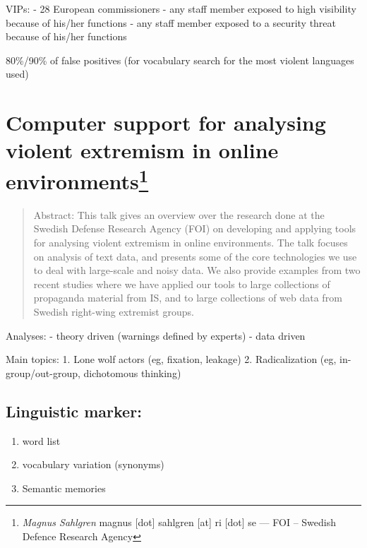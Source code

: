 \documentclass[]{book}
\providecommand{\tightlist}{%
  \setlength{\itemsep}{0pt}\setlength{\parskip}{0pt}}
\let\rmarkdownfootnote\footnote%
\def\footnote{\protect\rmarkdownfootnote}
\theoremstyle{definition}
\theoremstyle{definition}
\theoremstyle{definition}
\theoremstyle{remark}
\begin{document}
VIPs: - 28 European commissioners - any staff member exposed to high
visibility because of his/her functions - any staff member exposed to a
security threat because of his/her functions

80\%/90\% of false positives (for vocabulary search for the most violent
languages used)

\section[Computer support for analysing violent extremism in online
environments]{\texorpdfstring{Computer support for analysing violent
extremism in online environments\footnote{\emph{Magnus Sahlgren} magnus
  {[}dot{]} sahlgren {[}at{]} ri {[}dot{]} se --- FOI -- Swedish Defence
  Research Agency}}{Computer support for analysing violent extremism in online environments}}\label{computer-support-for-analysing-violent-extremism-in-online-environments}

\begin{quote}
Abstract: This talk gives an overview over the research done at the
Swedish Defense Research Agency (FOI) on developing and applying tools
for analysing violent extremism in online environments. The talk focuses
on analysis of text data, and presents some of the core technologies we
use to deal with large-scale and noisy data. We also provide examples
from two recent studies where we have applied our tools to large
collections of propaganda material from IS, and to large collections of
web data from Swedish right-wing extremist groups.
\end{quote}

Analyses: - theory driven (warnings defined by experts) - data driven

Main topics: 1. Lone wolf actors (eg, fixation, leakage) 2.
Radicalization (eg, in-group/out-group, dichotomous thinking)

\subsection{Linguistic marker:}\label{linguistic-marker}

\begin{enumerate}
\def\labelenumi{\arabic{enumi}.}
\tightlist
\item
  word list
\item
  vocabulary variation (synonyms)
\item
  Semantic memories
\end{enumerate}
\end{document}
